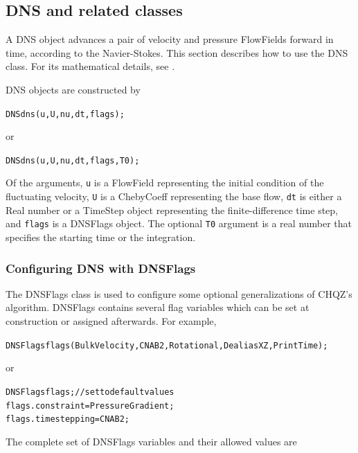 \documentclass{article}[12pt]
\begin{document}

\subsection{DNS and related classes}
\label{sec:nsintegrator}

A DNS object advances a pair of velocity and pressure FlowFields
forward in time, according to the Navier-Stokes. This section
describes how to use the DNS class. For its mathematical details,
see .

DNS objects are constructed by
\begin{alltt}
  DNS dns(u, U, nu, dt, flags);
\end{alltt}
or
\begin{alltt}
  DNS dns(u, U, nu, dt, flags, T0);
\end{alltt}
Of the arguments, {\tt u} is a FlowField representing the
initial condition of the fluctuating velocity, {\tt U} is a
ChebyCoeff representing the base flow, {\tt dt} is either a
Real number or a TimeStep object representing the finite-difference
time step, and {\tt flags} is a DNSFlags object. The optional
{\tt T0} argument is a real number that specifies the starting time
or the integration.

\subsubsection{Configuring DNS with DNSFlags}
\label{sec:dnsflags}

The DNSFlags class is used to configure some optional generalizations
of CHQZ's algorithm. DNSFlags contains several flag variables which can
be set at construction or assigned afterwards. For example,
\begin{alltt}
  DNSFlags flags(BulkVelocity, CNAB2, Rotational, DealiasXZ, PrintTime);
\end{alltt}
or
\begin{alltt}
  DNSFlags flags; // set to default values
  flags.constraint   = PressureGradient;
  flags.timestepping = CNAB2;
\end{alltt}
The complete set of DNSFlags variables and their allowed values are
\vspace{2mm}
\end{document}
